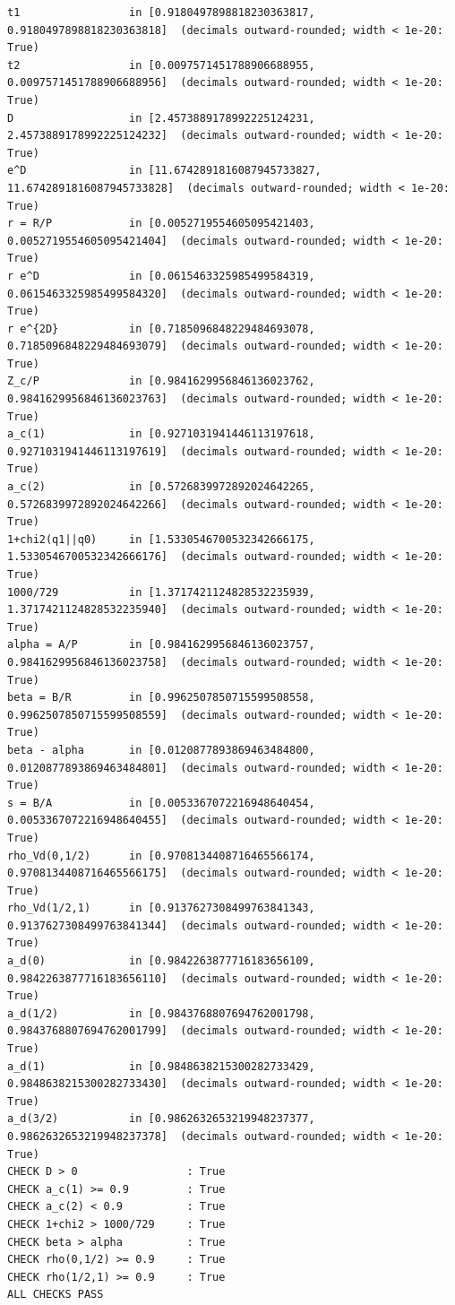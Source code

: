 \documentclass[11pt]{article}
\theoremstyle{remark}
\begin{document}
\begin{lstlisting}
t1                 in [0.9180497898818230363817, 0.9180497898818230363818]  (decimals outward-rounded; width < 1e-20: True)
t2                 in [0.0097571451788906688955, 0.0097571451788906688956]  (decimals outward-rounded; width < 1e-20: True)
D                  in [2.4573889178992225124231, 2.4573889178992225124232]  (decimals outward-rounded; width < 1e-20: True)
e^D                in [11.6742891816087945733827, 11.6742891816087945733828]  (decimals outward-rounded; width < 1e-20: True)
r = R/P            in [0.0052719554605095421403, 0.0052719554605095421404]  (decimals outward-rounded; width < 1e-20: True)
r e^D              in [0.0615463325985499584319, 0.0615463325985499584320]  (decimals outward-rounded; width < 1e-20: True)
r e^{2D}           in [0.7185096848229484693078, 0.7185096848229484693079]  (decimals outward-rounded; width < 1e-20: True)
Z_c/P              in [0.9841629956846136023762, 0.9841629956846136023763]  (decimals outward-rounded; width < 1e-20: True)
a_c(1)             in [0.9271031941446113197618, 0.9271031941446113197619]  (decimals outward-rounded; width < 1e-20: True)
a_c(2)             in [0.5726839972892024642265, 0.5726839972892024642266]  (decimals outward-rounded; width < 1e-20: True)
1+chi2(q1||q0)     in [1.5330546700532342666175, 1.5330546700532342666176]  (decimals outward-rounded; width < 1e-20: True)
1000/729           in [1.3717421124828532235939, 1.3717421124828532235940]  (decimals outward-rounded; width < 1e-20: True)
alpha = A/P        in [0.9841629956846136023757, 0.9841629956846136023758]  (decimals outward-rounded; width < 1e-20: True)
beta = B/R         in [0.9962507850715599508558, 0.9962507850715599508559]  (decimals outward-rounded; width < 1e-20: True)
beta - alpha       in [0.0120877893869463484800, 0.0120877893869463484801]  (decimals outward-rounded; width < 1e-20: True)
s = B/A            in [0.0053367072216948640454, 0.0053367072216948640455]  (decimals outward-rounded; width < 1e-20: True)
rho_Vd(0,1/2)      in [0.9708134408716465566174, 0.9708134408716465566175]  (decimals outward-rounded; width < 1e-20: True)
rho_Vd(1/2,1)      in [0.9137627308499763841343, 0.9137627308499763841344]  (decimals outward-rounded; width < 1e-20: True)
a_d(0)             in [0.9842263877716183656109, 0.9842263877716183656110]  (decimals outward-rounded; width < 1e-20: True)
a_d(1/2)           in [0.9843768807694762001798, 0.9843768807694762001799]  (decimals outward-rounded; width < 1e-20: True)
a_d(1)             in [0.9848638215300282733429, 0.9848638215300282733430]  (decimals outward-rounded; width < 1e-20: True)
a_d(3/2)           in [0.9862632653219948237377, 0.9862632653219948237378]  (decimals outward-rounded; width < 1e-20: True)
CHECK D > 0                 : True
CHECK a_c(1) >= 0.9         : True
CHECK a_c(2) < 0.9          : True
CHECK 1+chi2 > 1000/729     : True
CHECK beta > alpha          : True
CHECK rho(0,1/2) >= 0.9     : True
CHECK rho(1/2,1) >= 0.9     : True
ALL CHECKS PASS
\end{lstlisting}
\end{document}
